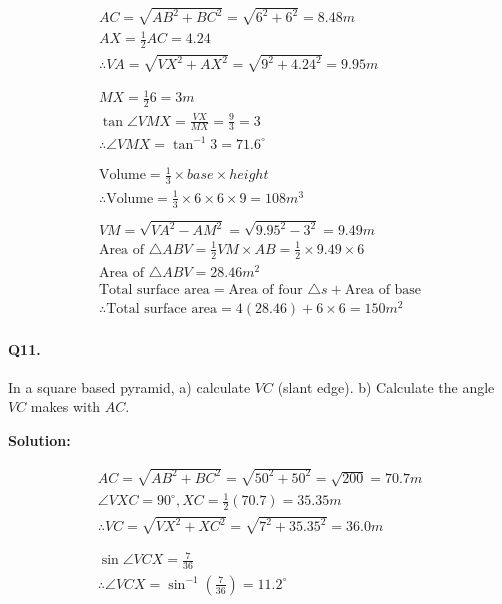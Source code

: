 \documentclass{article}
\begin{document}
\[
  \begin{aligned}
    AC = \sqrt{AB^{2}+BC^{2}} = \sqrt{6^{2}+6^{2}} = 8.48m \\
    AX = \frac{1}{2}AC = 4.24 \\
    \therefore VA = \sqrt{VX^{2}+AX^{2}} = \sqrt{9^{2}+4.24^{2}} = 9.95m \\
    \\
    \\
    MX = \frac{1}{2}6 = 3m \\
    \tan \angle VMX = \frac{VX}{MX} = \frac{9}{3} = 3 \\
    \therefore \angle VMX = \tan^{-1}3 = 71.6^{\circ} \\
    \\
    \\
    \text{Volume} = \frac{1}{3} \times base \times height \\
    \therefore \text{Volume} = \frac{1}{3} \times 6 \times 6 \times 9 = 108m^{3}
    \\
    \\
    VM = \sqrt{VA^{2}-AM^{2}} = \sqrt{9.95^{2}-3^{2}} = 9.49m \\
    \text{Area of } \triangle ABV = \frac{1}{2}VM \times AB = \frac{1}{2} \times 9.49 \times 6 \\
    \text{Area of } \triangle ABV = 28.46m^{2} \\
    \text{Total surface area} = \text{Area of four } \triangle s + \text{Area of base} \\
    \therefore \text{Total surface area} = 4(28.46) + 6 \times 6 = 150m^{2}
  \end{aligned}
\]

\paragraph{Q11.}
In a square based pyramid, a) calculate $VC$ (slant edge). b) Calculate the angle $VC$ makes with $AC$.

{\scriptsize \textbf{Solution:}}

\[
  \begin{aligned}
    AC = \sqrt{AB^{2}+BC^{2}} = \sqrt{50^{2}+50^{2}} = \sqrt{200} = 70.7m \\
    \angle VXC = 90^{\circ}, XC = \frac{1}{2}(70.7) = 35.35m \\
    \therefore VC = \sqrt{VX^{2}+XC^{2}} = \sqrt{7^{2}+35.35^{2}} = 36.0m \\
    \\
    \\
    \sin \angle VCX = \frac{7}{36} \\
    \therefore \angle VCX = \sin^{-1} \left( \frac{7}{36} \right) = 11.2^{\circ}
  \end{aligned}
\]
\end{document}
